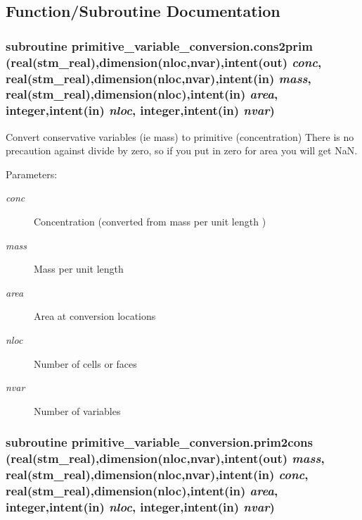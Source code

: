 \subsection{Function/Subroutine Documentation}
\hypertarget{a00067_2edfec41c794933d2a8f72a39e44154a}{
\subsubsection[{cons2prim}]{\setlength{\rightskip}{0pt plus 5cm}subroutine primitive\_\-variable\_\-conversion.cons2prim (real(stm\_\-real),dimension(nloc,nvar),intent(out) {\em conc}, \/  real(stm\_\-real),dimension(nloc,nvar),intent(in) {\em mass}, \/  real(stm\_\-real),dimension(nloc),intent(in) {\em area}, \/  integer,intent(in) {\em nloc}, \/  integer,intent(in) {\em nvar})}}
\label{a00067_2edfec41c794933d2a8f72a39e44154a}


Convert conservative variables (ie mass) to primitive (concentration) There is no precaution against divide by zero, so if you put in zero for area you will get NaN. 

\begin{Desc}
\item[Parameters:]
\begin{description}
\item[{\em conc}]Concentration (converted from mass per unit length )\item[{\em mass}]Mass per unit length \item[{\em area}]Area at conversion locations\item[{\em nloc}]Number of cells or faces\item[{\em nvar}]Number of variables \end{description}
\end{Desc}
\hypertarget{a00067_2c2c479bf94ce3408c1dd62d3d6ee8da}{
\subsubsection[{prim2cons}]{\setlength{\rightskip}{0pt plus 5cm}subroutine primitive\_\-variable\_\-conversion.prim2cons (real(stm\_\-real),dimension(nloc,nvar),intent(out) {\em mass}, \/  real(stm\_\-real),dimension(nloc,nvar),intent(in) {\em conc}, \/  real(stm\_\-real),dimension(nloc),intent(in) {\em area}, \/  integer,intent(in) {\em nloc}, \/  integer,intent(in) {\em nvar})}}
\label{a00067_2c2c479bf94ce3408c1dd62d3d6ee8da}


